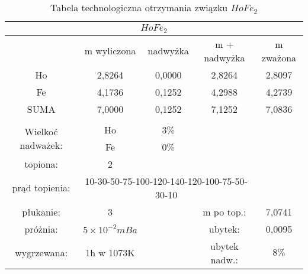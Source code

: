\documentclass[a4paper,12pt]{article}
\numberwithin{equation}{section}
\begin{document}
\begin{appendices}
\begin{table}[!ht]
\footnotesize
\caption{Tabela technologiczna otrzymania związku $HoFe_{2}$ }
\label{Hotechno}
\begin{tabular}{|c|c|c|c|c|}
\hline
\multicolumn{5}{|c|}{$HoFe_{2} $}\\\hline\hline
	& m wyliczona		&	nadwyżka	& m + nadwyżka	&	m zważona \\\hline
Ho	&	2,8264	&	0,0000	&	2,8264	&	2,8097	\\\hline
Fe	&	4,1736	&	0,1252	&	4,2988	&	4,2739	\\\hline
SUMA	&	7,0000	&	0,1252	&	7,1252	&	7,0836	\\\hline
\multicolumn{5}{|c|}{}\\\cline{1-3}
\multirow{2}{*}{Wielkoć nadważek:}	
	&	Ho 	&	3\%	& 	\multicolumn{2}{c|}{}\\\cline{2-3}	
	&	Fe	&	0\%	&	\multicolumn{2}{c|}{}\\\cline{1-3}
\multicolumn{1}{|c}{topiona:}	&	\multicolumn{1}{c|}{2} 	&	\multicolumn{3}{c|}{}\\\cline{1-4}
\multicolumn{1}{|c}{prąd topienia:}	&	\multicolumn{3}{c|}{10-30-50-75-100-120-140-120-100-75-50-30-10}	&	\\\cline{1-5}
\multicolumn{1}{|c}{płukanie:}	&	\multicolumn{1}{c|}{3}	&	&	\multicolumn{1}{c}{m po top.:}	&	\multicolumn{1}{c|}{7,0741} 	 	\\\cline{1-2}\cline{4-5}
\multicolumn{1}{|c}{próżnia:}	&	\multicolumn{1}{c|}{$5\times10^{-2}mBa$}	&	&	\multicolumn{1}{c}{ubytek:}	&	\multicolumn{1}{c|}{0,0095} 	 	\\\cline{1-2}\cline{4-5}
\multicolumn{1}{|c}{wygrzewana:}	&	\multicolumn{1}{c|}{1h w 1073K }	&	&	\multicolumn{1}{c}{ubytek nadw.:}	&	\multicolumn{1}{c|}{$8\%$} 	 	\\\hline
\end{tabular}
\end{table}


\end{appendices}
\end{document}

